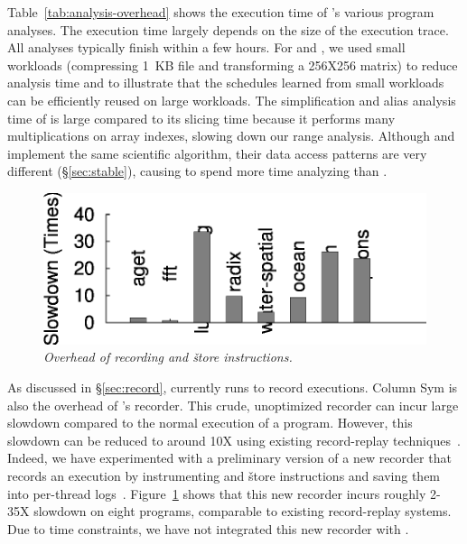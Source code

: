   Table~\ref{tab:analysis-overhead}
shows the execution time of \peregrine's various program analyses.  The
execution time largely depends on the size of the execution trace.  All
analyses typically finish within a few hours.  For \pbzip and \fft, we
used small workloads (compressing 1~KB file and transforming a 256X256
matrix) to reduce analysis time and to illustrate that the schedules
learned from small workloads can be efficiently reused on large workloads.
The simplification and alias analysis time of \fft is large compared to its
slicing time because it performs many multiplications on array indexes,
slowing down our range analysis.  Although \lun and \luc implement the
same scientific algorithm, their data access patterns are very different
(\S\ref{sec:stable}), causing \peregrine to spend more time analyzing \lun than \luc.

\begin{figure}[b!]
\centering
\includegraphics[width=.7\columnwidth]{peregrine/figures/new-recorder.eps}
\vspace{-.25in}
\caption{{\em Overhead of recording  and \v{store} instructions.}} \label{fig:new-recorder-overhead}
\end{figure}

As discussed in \S\ref{sec:record}, \peregrine currently runs \klee to record
executions.  Column Sym is also the overhead of \peregrine's recorder.  This
crude, unoptimized recorder can incur large slowdown compared to
the normal execution of a program.  However, this slowdown can be reduced
to around 10X using existing record-replay
techniques~\cite{idna:vee06,scribe:sigmetrics10}.  Indeed, we have
experimented with a preliminary version of a new recorder that records an
execution by instrumenting  and \v{store} instructions and saving
them into per-thread logs~\cite{idna:vee06}.  Figure~\ref{fig:new-recorder-overhead} shows that
this new recorder incurs roughly 2-35X slowdown on eight programs,
comparable to existing record-replay systems.  Due to time
constraints, we have not integrated this new recorder with \peregrine.

